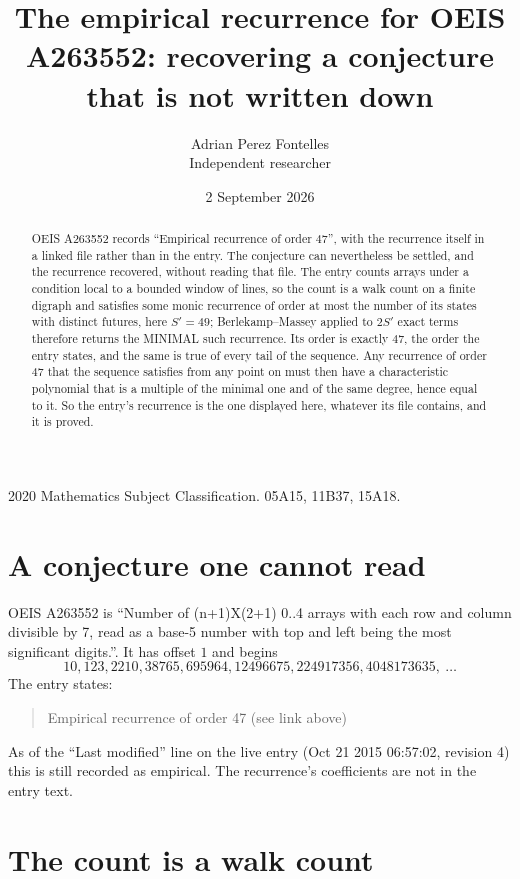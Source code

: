 \documentclass[11pt,a4paper]{article}
\title{The empirical recurrence for OEIS A263552: recovering a conjecture that is not written down}
\author{Adrian Perez Fontelles\\ \small Independent researcher}
\date{2 September 2026}
\theoremstyle{plain}
\theoremstyle{definition}
\begin{document}
\maketitle

\begin{abstract}
OEIS A263552 records ``Empirical recurrence of order $47$'', with the recurrence itself in a
linked file rather than in the entry. The conjecture can nevertheless be settled, and the
recurrence recovered, without reading that file. The entry counts arrays under a condition
local to a bounded window of lines, so the count is a walk count on a finite digraph and
satisfies some monic recurrence of order at most the number of its states with distinct
futures, here $S'=49$; Berlekamp--Massey applied to $2S'$ exact
terms therefore returns the MINIMAL such recurrence. Its order is exactly $47$, the order
the entry states, and the same is true of every tail of the sequence. Any recurrence of order
$47$ that the sequence satisfies from any point on must then have a characteristic
polynomial that is a multiple of the minimal one and of the same degree, hence equal to it. So
the entry's recurrence is the one displayed here, whatever its file contains, and it is
proved.
\end{abstract}

\noindent\small 2020 Mathematics Subject Classification. 05A15, 11B37, 15A18.\normalsize

\section{A conjecture one cannot read}

OEIS A263552 is ``Number of (n+1)X(2+1) 0..4 arrays with each row and column divisible by 7, read as a base-5 number with top and left being the most significant digits.''. It has offset $1$ and begins
\[
10, 123, 2210, 38765, 695964, 12496675, 224917356, 4048173635,\ \dots
\]
The entry states:
\begin{quote}
Empirical recurrence of order 47 (see link above)
\end{quote}
As of the ``Last modified'' line on the live entry (Oct 21 2015 06:57:02, revision 4) this is still
recorded as empirical. The recurrence's coefficients are not in the entry text.

\section{The count is a walk count}
\end{document}
